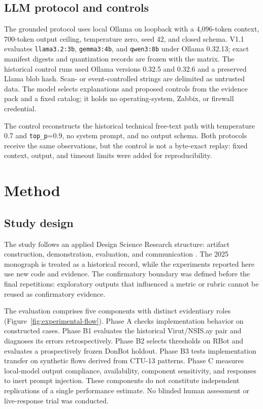 \documentclass[11pt,a4paper,onecolumn]{IEEEtran}
\begin{document}
\subsection{LLM protocol and controls}

The grounded protocol uses local Ollama on loopback with a 4,096-token context, 700-token output ceiling, temperature zero, seed 42, and closed schema. V1.1 evaluates \texttt{llama3.2:3b}, \texttt{gemma3:4b}, and \texttt{qwen3:8b} under Ollama 0.32.13; exact manifest digests and quantization records are frozen with the matrix. The historical control runs used Ollama versions 0.32.5 and 0.32.6 and a preserved Llama blob hash. Scan- or event-controlled strings are delimited as untrusted data. The model selects explanations and proposed controls from the evidence pack and a fixed catalog; it holds no operating-system, Zabbix, or firewall credential.

The control reconstructs the historical technical free-text path with temperature 0.7 and \texttt{top\_p}=0.9, no system prompt, and no output schema. Both protocols receive the same observations, but the control is not a byte-exact replay: fixed context, output, and timeout limits were added for reproducibility.

\section{Method}

\subsection{Study design}

The study follows an applied Design Science Research structure: artifact construction, demonstration, evaluation, and communication \cite{peffers2007}. The 2025 monograph is treated as a historical record, while the experiments reported here use new code and evidence. The confirmatory boundary was defined before the final repetitions: exploratory outputs that influenced a metric or rubric cannot be reused as confirmatory evidence.

The evaluation comprises five components with distinct evidentiary roles (Figure~\ref{fig:experimental-flow}). Phase A checks implementation behavior on constructed cases. Phase B1 evaluates the historical Virut/NSIS.ay pair and diagnoses its errors retrospectively. Phase B2 selects thresholds on RBot and evaluates a prospectively frozen DonBot holdout. Phase B3 tests implementation transfer on synthetic flows derived from CTU-13 patterns. Phase C measures local-model output compliance, availability, component sensitivity, and responses to inert prompt injection. These components do not constitute independent replications of a single performance estimate. No blinded human assessment or live-response trial was conducted.
\end{document}
